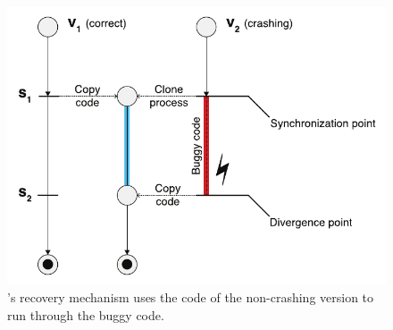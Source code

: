 

\begin{figure}[t]
\centering
\includegraphics[width=0.6\columnwidth]{safe-updates/figures/strategy}
\caption{\rem's recovery mechanism uses the code of the non-crashing
  version to run through the buggy code.}
\label{fig:solution3}
\end{figure}


